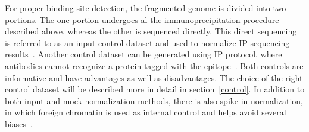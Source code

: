 For proper binding site detection, the fragmented genome is divided into two portions. 
The one portion undergoes al the immunoprecipitation procedure described above, whereas the other is sequenced directly. 
This direct sequencing is referred to as an input control dataset and used to normalize IP sequencing results~\cite{kidder2011chip}. 
Another control dataset can be generated using IP protocol, where antibodies cannot recognize a protein tagged with the epitope~\cite{flensburg2014comparison}. 
Both controls are informative and have advantages as well as disadvantages.
The choice of the right control dataset will be described more in detail in section~\ref{control}.
In addition to both input and mock normalization methods, there is also spike-in normalization, in which foreign chromatin is used as internal control and helps avoid several biases~\cite{bonhoure2014quantifying}.
